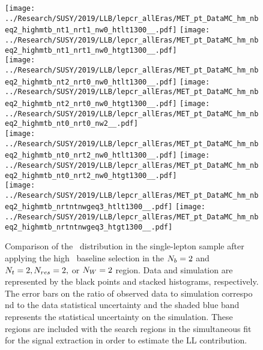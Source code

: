 \begin{figure}[!htb]
	\begin{center}
  \texttt{[image: ../Research/SUSY/2019/LLB/lepcr\_allEras/MET\_pt\_DataMC\_hm\_nbeq2\_highmtb\_nt1\_nrt1\_nw0\_htlt1300\_\_.pdf]}
  \texttt{[image: ../Research/SUSY/2019/LLB/lepcr\_allEras/MET\_pt\_DataMC\_hm\_nbeq2\_highmtb\_nt1\_nrt1\_nw0\_htgt1300\_\_.pdf]} \\
  \texttt{[image: ../Research/SUSY/2019/LLB/lepcr\_allEras/MET\_pt\_DataMC\_hm\_nbeq2\_highmtb\_nt2\_nrt0\_nw0\_htlt1300\_\_.pdf]}
  \texttt{[image: ../Research/SUSY/2019/LLB/lepcr\_allEras/MET\_pt\_DataMC\_hm\_nbeq2\_highmtb\_nt2\_nrt0\_nw0\_htgt1300\_\_.pdf]} 
  \texttt{[image: ../Research/SUSY/2019/LLB/lepcr\_allEras/MET\_pt\_DataMC\_hm\_nbeq2\_highmtb\_nt0\_nrt0\_nw2\_\_.pdf]} \\
  \texttt{[image: ../Research/SUSY/2019/LLB/lepcr\_allEras/MET\_pt\_DataMC\_hm\_nbeq2\_highmtb\_nt0\_nrt2\_nw0\_htlt1300\_\_.pdf]}  
  \texttt{[image: ../Research/SUSY/2019/LLB/lepcr\_allEras/MET\_pt\_DataMC\_hm\_nbeq2\_highmtb\_nt0\_nrt2\_nw0\_htgt1300\_\_.pdf]} \\
  \texttt{[image: ../Research/SUSY/2019/LLB/lepcr\_allEras/MET\_pt\_DataMC\_hm\_nbeq2\_highmtb\_nrtntnwgeq3\_htlt1300\_\_.pdf]} 
  \texttt{[image: ../Research/SUSY/2019/LLB/lepcr\_allEras/MET\_pt\_DataMC\_hm\_nbeq2\_highmtb\_nrtntnwgeq3\_htgt1300\_\_.pdf]} \\
	\end{center}
	\caption{Comparison of the \met~distribution in the single-lepton sample after applying the high \dm~baseline selection in the $N_{b}=2$ and $N_{t}=2, N_{res}=2,$ or $N_{W}=2$ region. Data and simulation are represented by the black points and stacked histograms, respectively. The error bars on the ratio of observed data to simulation correspo    nd to the data statistical uncertainty and the shaded blue band represents the statistical uncertainty on the simulation. These regions are included with the search regions in the simultaneous fit for the signal extraction in order to estimate the LL contribution.
	 }
	\label{fig:llb-1lcr-datavsmc-hm-nb2-2}
\end{figure}

